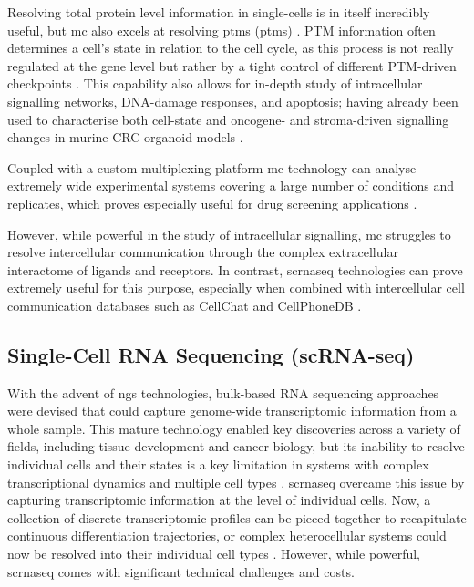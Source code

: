 Resolving total protein level information in single-cells is in itself incredibly useful, but \acrshort{mc} also excels at resolving \acrlong{ptm}s (\acrshort{ptm}s) \cite{ochoa_functional_2019}. PTM information often determines a cell's state in relation to the cell cycle, as this process is not really regulated at the gene level but rather by a tight control of different PTM-driven checkpoints \cite{cuijpers_guiding_2018}. This capability also allows for in-depth study of intracellular signalling networks, DNA-damage responses, and apoptosis; having already been used to characterise both cell-state and oncogene- and stroma-driven signalling changes in murine CRC organoid models \cite{qin_cell-type-specific_2020}.

Coupled with a custom multiplexing platform \cite{sufi_multiplexed_2021} \acrshort{mc} technology can analyse extremely wide experimental systems covering a large number of conditions and replicates, which proves especially useful for drug screening applications \cite{zapatero_trellis_2023}.

However, while powerful in the study of intracellular signalling, \acrlong{mc} struggles to resolve intercellular communication through the complex extracellular interactome of ligands and receptors. In contrast, \acrlong{scrnaseq} technologies can prove extremely useful for this purpose, especially when combined with intercellular cell communication databases such as CellChat \cite{jin_inference_2021} and CellPhoneDB \cite{efremova_cellphonedb_2020}.


\subsection{Single-Cell RNA Sequencing (scRNA-seq)}

With the advent of \acrfull{ngs} technologies, bulk-based RNA sequencing approaches were devised that could capture genome-wide transcriptomic information from a whole sample. This mature technology enabled key discoveries across a variety of fields, including tissue development and cancer biology, but its inability to resolve individual cells and their states is a key limitation in systems with complex transcriptional dynamics and multiple cell types \cite{li_bulk_2021}.
\acrshort{scrnaseq} overcame this issue by capturing transcriptomic information at the level of individual cells. Now, a collection of discrete transcriptomic profiles can be pieced together to recapitulate continuous differentiation trajectories, or complex heterocellular systems could now be resolved into their individual cell types \cite{haber_single-cell_2017}. However, while powerful, \acrshort{scrnaseq} comes with significant technical challenges and costs. 

